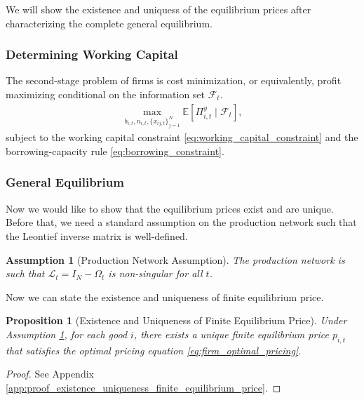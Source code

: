 \documentclass[12pt]{article}
\newtheorem{proposition}{Proposition}[section]
\numberwithin{equation}{section}
\newtheorem{assumption}{Assumption}[section] %
\begin{document}
We will show the existence and uniquess of the equilibrium prices after characterizing the complete general equilibrium.

\subsubsection{Determining Working Capital}
The second-stage problem of firms is cost minimization, or equivalently, profit maximizing conditional on the information set $\mathcal{F}_t$.
\begin{align}\label{eq:firm_second_problem}
    \max_{b_{i,t}, n_{i,t}, \{x_{ij,t}\}_{j=1}^N} \mathbb{E}\left[ \Pi^y_{i,t} \mid \mathcal{F}_t \right],
\end{align}
subject to the working capital constraint \eqref{eq:working_capital_constraint} and the borrowing-capacity rule \eqref{eq:borrowing_constraint}.



\subsubsection{General Equilibrium}
Now we would like to show that the equilibrium prices exist and are unique. Before that, we need a standard assumption on the production network such that the Leontief inverse matrix is well-defined.
\begin{assumption}[Production Network Assumption]\label{ass:production_network_assumption}
    The production network is such that $\mathcal{L}_t =  I_N - \Omega_t$ is non-singular for all $t$.
\end{assumption}

Now we can state the existence and uniqueness of finite equilibrium price.
\begin{proposition}[Existence and Uniqueness of Finite Equilibrium Price]\label{prop:existence_uniqueness_finite_equilibrium_price}
    Under Assumption \ref{ass:production_network_assumption}, for each good $i$, there exists a unique finite equilibrium price $p_{i,t}$ that satisfies the optimal pricing equation \eqref{eq:firm_optimal_pricing}.
\end{proposition}
\begin{proof}
    See Appendix \ref{app:proof_existence_uniqueness_finite_equilibrium_price}.
\end{proof} 




\clearpage


\end{document}
